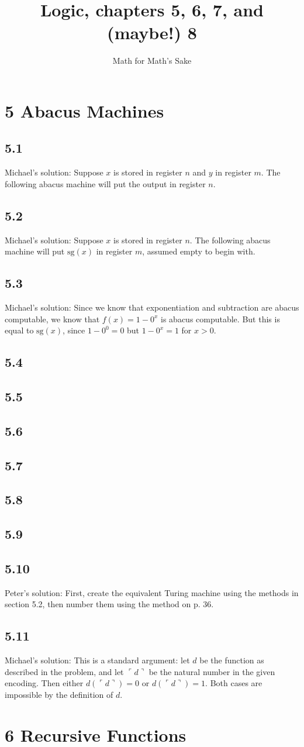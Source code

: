 \documentclass{article}
\title{Logic, chapters 5, 6, 7, and (maybe!) 8}
\author{Math for Math's Sake}
\newcommand\s{\section*}
\renewcommand\ss{\subsection*}
\newcommand\ms{Michael's solution: } %
\newcommand\pf{Peter's solution: } %
\begin{document}
\maketitle
\s{5 Abacus Machines}
\ss{5.1}
\ms Suppose $x$ is stored in register $n$ and $y$ in register $m$.  The following abacus machine will put the output in register $n$.

\begin{center}
\end{center}

\ss{5.2}
\ms Suppose $x$ is stored in register $n$.  The following abacus
machine will put $\mathrm{sg}(x)$ in register $m$, assumed empty to begin with.

\begin{center}
\end{center}
\ss{5.3}
\ms Since we know that exponentiation and subtraction are abacus computable, we know that $f(x)=1-0^x$ is abacus computable.  But this is equal to
$\mathrm{sg}(x)$, since $1-0^0 = 0$ but $1-0^x = 1$ for $x>0$.
\ss{5.4}
\ss{5.5}
\ss{5.6}
\ss{5.7}
\ss{5.8}
\ss{5.9}
\ss{5.10}
\pf First, create the equivalent Turing machine using the methods in section 5.2, then number them using the method on p. 36.
\ss{5.11}
\ms This is a standard argument: let $d$ be the function as described in the problem, and let $\ulcorner d\urcorner$ be the natural number in the given encoding.  Then either $d(\ulcorner d\urcorner) = 0$ or $d(\ulcorner d\urcorner) = 1$.  Both cases are impossible by the definition of $d$.

\s{6 Recursive Functions}
\newcommand\id{\mathrm{id}} %
\newcommand\Cn{\mathrm{Cn}} %
\renewcommand\Pr{\mathrm{Pr}} %
\newcommand\Mn{\mathrm{Mn}} %
\end{document}

